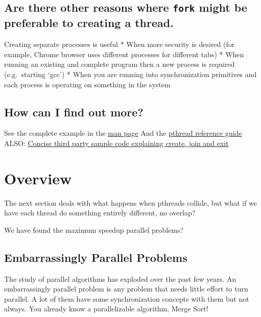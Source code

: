 \subsection{\texorpdfstring{Are there other reasons where \texttt{fork}
might be preferable to creating a
thread.}{Are there other reasons where fork might be preferable to creating a thread.}}\label{are-there-other-reasons-where-fork-might-be-preferable-to-creating-a-thread.}

Creating separate processes is useful * When more security is desired
(for example, Chrome browser uses different processes for different
tabs) * When running an existing and complete program then a new process
is required (e.g.~starting `gcc') * When you are running into
synchronization primitives and each process is operating on something in
the system

\subsection{How can I find out more?}\label{how-can-i-find-out-more}

See the complete example in the
\href{http://man7.org/linux/man-pages/man3/pthread_create.3.html}{man
page} And the
\href{http://man7.org/linux/man-pages/man7/pthreads.7.html}{pthread
reference guide} ALSO:
\href{http://www.thegeekstuff.com/2012/04/terminate-c-thread/}{Concise
third party sample code explaining create, join and exit}

\section{Overview}\label{overview}

The next section deals with what happens when pthreads collide, but what
if we have each thread do something entirely different, no overlap?

We have found the maximum speedup parallel problems?

\subsection{Embarrassingly Parallel
Problems}\label{embarrassingly-parallel-problems}

The study of parallel algorithms has exploded over the past few years.
An embarrassingly parallel problem is any problem that needs little
effort to turn parallel. A lot of them have some synchronization
concepts with them but not always. You already know a parallelizable
algorithm, Merge Sort!

